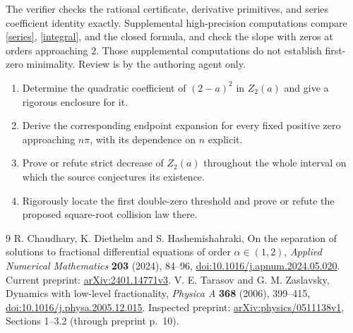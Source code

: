 \documentclass[11pt]{article}
\begin{document}
The verifier checks the rational certificate, derivative primitives,
and series coefficient identity exactly. Supplemental high-precision
computations compare \eqref{series}, \eqref{integral}, and the closed
formula, and check the slope with zeros at orders approaching $2$.
Those supplemental computations do not establish first-zero minimality.
Review is by the authoring agent only.

\begin{enumerate}[label=\textbf{Task \arabic*:},start=2,leftmargin=*]
\item Determine the quadratic coefficient of $(2-a)^2$ in $Z_2(a)$
and give a rigorous enclosure for it.
\item Derive the corresponding endpoint expansion for every fixed
positive zero approaching $n\pi$, with its dependence on $n$ explicit.
\item Prove or refute strict decrease of $Z_2(a)$ throughout the
whole interval on which the source conjectures its existence.
\item Rigorously locate the first double-zero threshold and prove
or refute the proposed square-root collision law there.
\end{enumerate}

\small
\begin{thebibliography}{9}
 R. Chaudhary, K. Diethelm and S. Hashemishahraki,
On the separation of solutions to fractional differential equations
of order $\alpha\in(1,2)$, \emph{Applied Numerical Mathematics}
\textbf{203} (2024), 84--96,
\href{https://doi.org/10.1016/j.apnum.2024.05.020}{doi:10.1016/j.apnum.2024.05.020}.
Current preprint: \href{https://arxiv.org/abs/2401.14771}{arXiv:2401.14771v3}.
 V. E. Tarasov and G. M. Zaslavsky,
Dynamics with low-level fractionality, \emph{Physica A}
\textbf{368} (2006), 399--415,
\href{https://doi.org/10.1016/j.physa.2005.12.015}{doi:10.1016/j.physa.2005.12.015}.
Inspected preprint: \href{https://arxiv.org/abs/physics/0511138}{arXiv:physics/0511138v1},
Sections 1--3.2 (through preprint p.~10).
\end{thebibliography}
\end{document}

